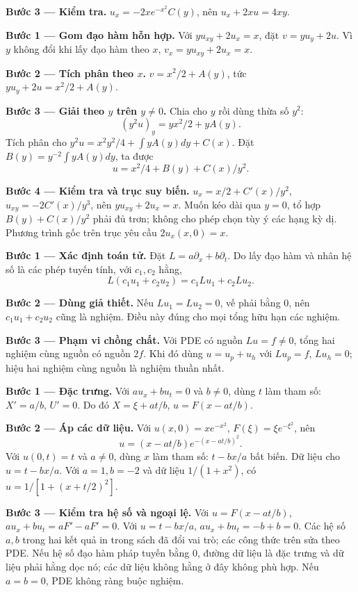 \textbf{Bước 3 — Kiểm tra.} $u_x=-2xe^{-x^2}C(y)$, nên $u_x+2xu=4xy$.

\textbf{Bước 1 — Gom đạo hàm hỗn hợp.} Với $yu_{xy}+2u_x=x$, đặt $v=yu_y+2u$. Vì $y$ không đổi khi lấy đạo hàm theo $x$, $v_x=yu_{xy}+2u_x=x$.

\textbf{Bước 2 — Tích phân theo $x$.} $v=x^2/2+A(y)$, tức $yu_y+2u=x^2/2+A(y)$.

\textbf{Bước 3 — Giải theo $y$ trên $y\ne0$.} Chia cho $y$ rồi dùng thừa số $y^2$:
\[(y^2u)_y=yx^2/2+yA(y).\]
Tích phân cho $y^2u=x^2y^2/4+\int yA(y)dy+C(x)$. Đặt $B(y)=y^{-2}\int yA(y)dy$, ta được
\[u=x^2/4+B(y)+C(x)/y^2.\]

\textbf{Bước 4 — Kiểm tra và trục suy biến.} $u_x=x/2+C'(x)/y^2$, $u_{xy}=-2C'(x)/y^3$, nên $yu_{xy}+2u_x=x$. Muốn kéo dài qua $y=0$, tổ hợp $B(y)+C(x)/y^2$ phải đủ trơn; không cho phép chọn tùy ý các hạng kỳ dị. Phương trình gốc trên trục yêu cầu $2u_x(x,0)=x$.

\textbf{Bước 1 — Xác định toán tử.} Đặt $L=a\partial_x+b\partial_t$. Do lấy đạo hàm và nhân hệ số là các phép tuyến tính, với $c_1,c_2$ hằng,
\[L(c_1u_1+c_2u_2)=c_1Lu_1+c_2Lu_2.\]

\textbf{Bước 2 — Dùng giả thiết.} Nếu $Lu_1=Lu_2=0$, vế phải bằng 0, nên $c_1u_1+c_2u_2$ cũng là nghiệm. Điều này đúng cho mọi tổng hữu hạn các nghiệm.

\textbf{Bước 3 — Phạm vi chồng chất.} Với PDE có nguồn $Lu=f\ne0$, tổng hai nghiệm cùng nguồn có nguồn $2f$. Khi đó dùng $u=u_p+u_h$ với $Lu_p=f$, $Lu_h=0$; hiệu hai nghiệm cùng nguồn là nghiệm thuần nhất.

\textbf{Bước 1 — Đặc trưng.} Với $au_x+bu_t=0$ và $b\ne0$, dùng $t$ làm tham số: $X'=a/b$, $U'=0$. Do đó $X=\xi+at/b$, $u=F(x-at/b)$.

\textbf{Bước 2 — Áp các dữ liệu.} Với $u(x,0)=xe^{-x^2}$, $F(\xi)=\xi e^{-\xi^2}$, nên
\[u=(x-at/b)e^{-(x-at/b)^2}.\]
Với $u(0,t)=t$ và $a\ne0$, dùng $x$ làm tham số: $t-bx/a$ bất biến. Dữ liệu cho $u=t-bx/a$. Với $a=1,b=-2$ và dữ liệu $1/(1+x^2)$, có $u=1/[1+(x+t/2)^2]$.

\textbf{Bước 3 — Kiểm tra hệ số và ngoại lệ.} Với $u=F(x-at/b)$, $au_x+bu_t=aF'-aF'=0$. Với $u=t-bx/a$, $au_x+bu_t=-b+b=0$. Các hệ số $a,b$ trong hai kết quả in trong sách đã đổi vai trò; các công thức trên sửa theo PDE. Nếu hệ số đạo hàm pháp tuyến bằng 0, đường dữ liệu là đặc trưng và dữ liệu phải hằng dọc nó; các dữ liệu không hằng ở đây không phù hợp. Nếu $a=b=0$, PDE không ràng buộc nghiệm.

